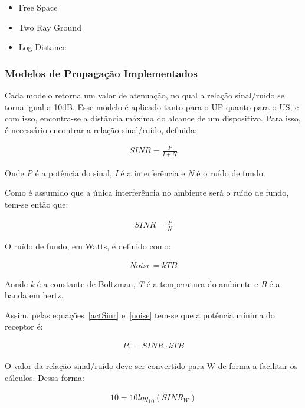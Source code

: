 \begin{itemize}
\item Free Space
\item Two Ray Ground
\item Log Distance
\end{itemize}

\subsubsection{Modelos de Propagação Implementados}

Cada modelo retorna um valor de atenuação, no qual a relação sinal/ruído se torna igual a 10dB. Esse modelo é aplicado tanto para o UP quanto para o US, e com isso, encontra-se a distância máxima do alcance de um dispositivo. Para isso, é necessário encontrar a relação sinal/ruído, definida:

\begin{align}
  \label{Sinr} SINR=\frac{P}{I+N}
\end{align}

Onde \textit{P} é a potência do sinal, \textit{I} é a interferência e \textit{N} é o ruído de fundo.

Como é assumido que a única interferência no ambiente será o ruído de fundo, tem-se então que:

\begin{align}
  \label{actSinr} SINR=\frac{P}{N}
\end{align}

O ruído de fundo, em Watts, é definido como:

\begin{align}
  \label{noise} Noise=kTB
\end{align}

Aonde \textit{k} é a constante de Boltzman, \textit{T} é a temperatura do ambiente e \textit{B} é a banda em hertz.

Assim, pelas equações~\ref{actSinr} e~\ref{noise} tem-se que a potência mínima do receptor é:

\begin{align}
  \label{minPot} P_r= SINR \cdot  kTB
\end{align}

O valor da relação sinal/ruído deve ser convertido para W de forma a facilitar os cálculos. Dessa forma:

\begin{align}
  \label{SinrW} 10= 10 log_{10} (SINR_W)
\end{align}

